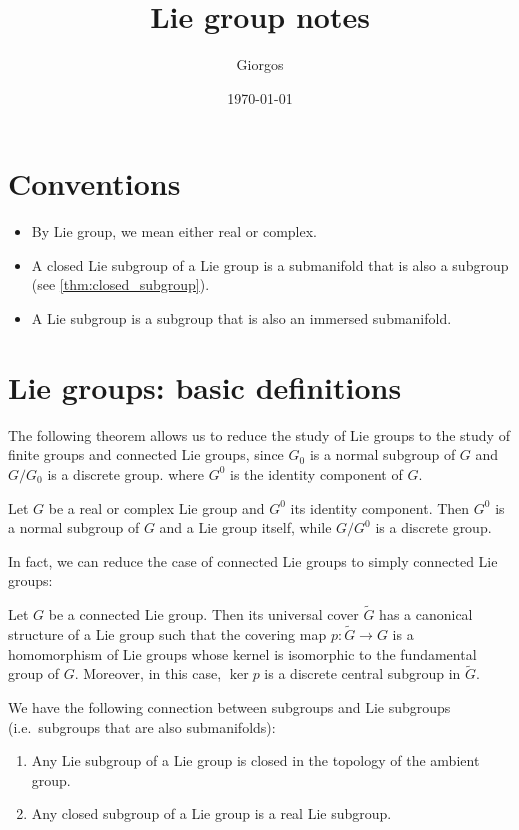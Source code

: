 \documentclass{report}
\title{Lie group notes}
\author{Giorgos}
\date{\today}
\begin{document}
\maketitle

\tableofcontents

\chapter*{Conventions}
\begin{itemize}
    \item By Lie group, we mean either real or complex.
    \item A closed Lie subgroup of a Lie group is a submanifold that is also a subgroup (see \cref{thm:closed_subgroup}). 
    \item A Lie subgroup is a subgroup that is also an immersed submanifold.
\end{itemize}

\chapter{Lie groups: basic definitions}
The following theorem allows us to reduce the study of Lie groups to the study of finite groups and connected Lie groups, since $G_0$ is a normal subgroup of $G$ and $G/G_0$ is a discrete group.
where $G^0$ is the identity component of $G$.
\begin{theorem}
    Let $G$ be a real or complex Lie group and $G^0$ its identity component.
    Then $G^0$ is a normal subgroup of $G$ and a Lie group itself, while $G/G^0$ is a discrete group.
\end{theorem}

In fact, we can reduce the case of connected Lie groups to simply connected Lie groups:
\begin{theorem}
    Let $G$ be a connected Lie group. Then its universal cover $\tilde G$ has a canonical structure of a Lie group such that the covering map $p: \tilde G \to G$ is a homomorphism of Lie groups whose kernel is isomorphic to the fundamental group of $G$.
    Moreover, in this case, $\ker p$ is a discrete central subgroup in $\tilde G$.
\end{theorem}

We have the following connection between subgroups and Lie subgroups (i.e.\ subgroups that are also submanifolds):
\begin{theorem}\label{thm:closed_subgroup}
    \begin{enumerate}[label=(\roman*)]
        \item Any Lie subgroup of a Lie group is closed in the topology of the ambient group.
        \item Any closed subgroup of a Lie group is a real Lie subgroup.
    \end{enumerate}
\end{theorem}
\end{document}
